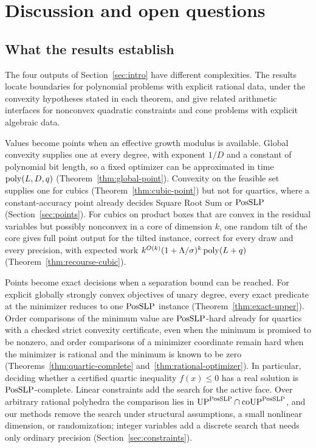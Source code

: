 \section{Discussion and open questions}
\label{sec:discussion}

\subsection{What the results establish}
\label{sec:discussion-summary}

The four outputs of Section~\ref{sec:intro} have different complexities.
The results locate boundaries for polynomial problems with explicit rational
data, under the convexity hypotheses stated in each theorem, and give related
arithmetic interfaces for nonconvex quadratic constraints and cone problems
with explicit algebraic data.

Values become points when an effective growth modulus is available. Global
convexity supplies one at every degree, with exponent $1/D$ and a constant of
polynomial bit length, so a fixed optimizer can be approximated in time
$\operatorname{poly}(L,D,q)$ (Theorem~\ref{thm:global-point}). Convexity on the feasible set
supplies one for cubics (Theorem~\ref{thm:cubic-point}) but not for quartics,
where a constant-accuracy point already decides Square Root Sum or $\mathrm{PosSLP}$
(Section~\ref{sec:points}). For cubics on product boxes that are convex in
the residual variables but possibly nonconvex in a core of dimension $k$, one
random tilt of the core gives full point output for the tilted instance,
correct for every draw and every precision, with expected work
$k^{O(k)}(1+\Lambda/\sigma)^k\operatorname{poly}(L+q)$ (Theorem~\ref{thm:recourse-cubic}).

Points become exact decisions when a separation bound can be reached. For
explicit globally strongly convex objectives of unary degree, every exact
predicate at the minimizer reduces to one $\mathrm{PosSLP}$ instance
(Theorem~\ref{thm:exact-upper}). Order comparisons of the minimum value are
$\mathrm{PosSLP}$-hard already for quartics with a checked strict convexity
certificate, even when the minimum is promised to be nonzero, and order
comparisons of a minimizer coordinate remain hard when the minimizer is
rational and the minimum is known to be zero
(Theorems~\ref{thm:quartic-complete} and~\ref{thm:rational-optimizer}). In
particular, deciding whether a certified quartic inequality $f(x)\le0$ has a
real solution is $\mathrm{PosSLP}$-complete. Linear constraints add the search for
the active face. Over arbitrary rational polyhedra the comparison lies in
$\mathrm{UP}^{\mathrm{PosSLP}}\cap\mathrm{coUP}^{\mathrm{PosSLP}}$, and our methods remove the
search under structural assumptions, a small nonlinear dimension, or
randomization; integer variables add a discrete search that needs only
ordinary precision (Section~\ref{sec:constraints}).

